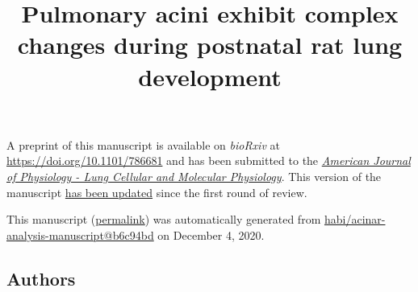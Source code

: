 \documentclass[
  american,
]{article}
\title{Pulmonary acini exhibit complex changes during postnatal rat lung development}
\author{}
\date{}
\begin{document}
\maketitle

A preprint of this manuscript is available on \emph{bioRxiv} at \url{https://doi.org/10.1101/786681} and has been submitted to the \href{https://journals.physiology.org/journal/ajplung}{\emph{American Journal of Physiology - Lung Cellular and Molecular Physiology}}.
This version of the manuscript \href{https://github.com/habi/acinar-analysis-manuscript/compare/d6fc17bd66bdca5cbff30d53e1dbc02d5351609b...b6c94bd9b09a75063c29a39afcb8831a1724e180}{has been updated} since the first round of review.

This manuscript
(\href{https://habi.github.io/acinar-analysis-manuscript/v/b6c94bd9b09a75063c29a39afcb8831a1724e180/}{permalink})
was automatically generated
from \href{https://github.com/habi/acinar-analysis-manuscript/tree/b6c94bd9b09a75063c29a39afcb8831a1724e180}{habi/acinar-analysis-manuscript@b6c94bd}
on December 4, 2020.

\hypertarget{authors}{%
\subsection{Authors}\label{authors}}
\end{document}
